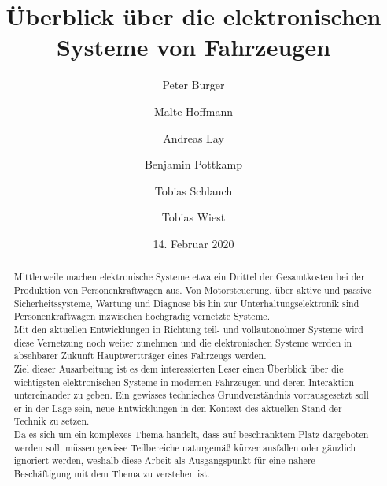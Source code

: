 \documentclass[]{article}
\title{Überblick über die elektronischen Systeme von Fahrzeugen}
\author{
	Peter Burger
	\and
	Malte Hoffmann
	\and
	Andreas Lay
	\and
	Benjamin Pottkamp
	\and
	Tobias Schlauch
	\and
	Tobias Wiest
}
\date{14. Februar 2020}
\begin{document}
\maketitle

\begin{abstract}
	Mittlerweile machen elektronische Systeme etwa ein Drittel der Gesamtkosten bei der Produktion von
	Personenkraftwagen aus. Von Motorsteuerung, über aktive und passive Sicherheitssysteme, 
	Wartung und Diagnose bis hin zur Unterhaltungselektronik sind Personenkraftwagen inzwischen hochgradig
	vernetzte Systeme.\\
	
	Mit den aktuellen Entwicklungen in Richtung teil- und vollautonohmer Systeme wird diese Vernetzung noch weiter zunehmen 
	und die elektronischen Systeme werden in absehbarer Zukunft Hauptwertträger eines Fahrzeugs werden.\\
	
	Ziel dieser Ausarbeitung ist es dem interessierten Leser einen Überblick über die wichtigsten elektronischen Systeme in
	modernen Fahrzeugen und deren Interaktion untereinander zu geben. Ein gewisses technisches Grundverständnis vorrausgesetzt 
	soll er in der Lage sein, neue Entwicklungen in den Kontext des aktuellen Stand der Technik zu setzen.\\
	
	Da es sich um ein komplexes Thema handelt, dass auf beschränktem Platz dargeboten werden soll, müssen gewisse Teilbereiche naturgemäß
	kürzer ausfallen oder gänzlich ignoriert werden, weshalb diese Arbeit als Ausgangspunkt für eine nähere Beschäftigung mit dem Thema
	zu verstehen ist.
\end{abstract}

\newpage

\tableofcontents




%






\end{document}

